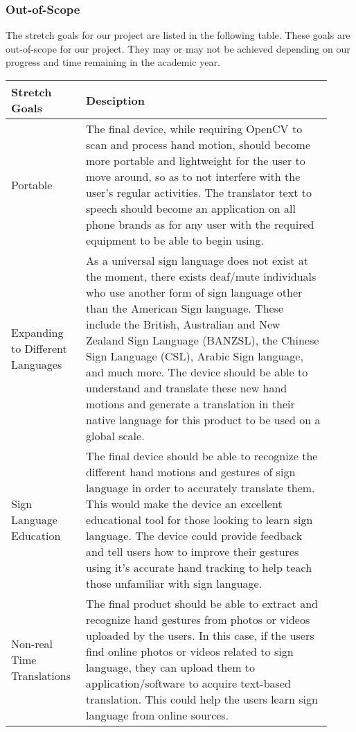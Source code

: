 \documentclass[12pt]{article}
\begin{document}
\subsubsection{Out-of-Scope}
\indent The stretch goals for our project are listed in the following table. These goals are out-of-scope for our 
project. They may or may not be achieved depending on our progress and time remaining in the academic year.

\renewcommand{\arraystretch}{1.2}
\noindent \begin{tabularx}{\textwidth}{p{0.2\linewidth}|p{0.72\linewidth}}
\toprule
\textbf{Stretch Goals} & \textbf{Desciption}\\
\midrule
Portable
& The final device, while requiring OpenCV to scan and process hand motion, should become more portable and lightweight 
for the user to move around, so as to not interfere with the user’s regular activities. The translator text to speech 
should become an application on all phone brands as for any user with the required equipment to be able to begin using.\\
\hline
Expanding to Different Languages
& As a universal sign language does not exist at the moment, there exists deaf/mute individuals who use another form of 
sign language other than the American Sign language. These include the British, Australian and New Zealand Sign Language (BANZSL),
the Chinese Sign Language (CSL), Arabic Sign language, and much more. The device should be able to understand and translate these 
new hand motions and generate a translation in their native language for this product to be used on a global scale.\\
\hline
Sign Language Education
& The final device should be able to recognize the different hand motions and gestures of sign language in order to accurately
translate them. This would make the device an excellent educational tool for those looking to learn sign language. The device 
could provide feedback and tell users how to improve their gestures using it’s accurate hand tracking to help teach those unfamiliar 
with sign language.\\
\hline
Non-real Time Translations
& The final product should be able to extract and recognize hand gestures from photos or videos uploaded by the users. 
In this case, if the users find online photos or videos related to sign language, they can upload them to application/software
to acquire text-based translation. This could help the users learn sign language from online sources.\\
\bottomrule
\end{tabularx}
\end{document}
